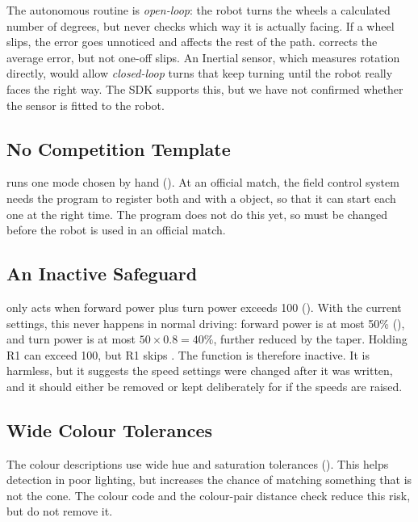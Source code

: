 The autonomous routine is \emph{open-loop}: the robot turns the wheels a calculated
number of degrees, but never checks which way it is actually facing. If a wheel
slips, the error goes unnoticed and affects the rest of the path. 
corrects the average error, but not one-off slips. An Inertial sensor, which
measures rotation directly, would allow \emph{closed-loop} turns that keep turning
until the robot really faces the right way. The SDK supports this, but we have not
confirmed whether the sensor is fitted to the robot.

\subsection{No Competition Template}

 runs one mode chosen by hand (). At an official match,
the field control system needs the program to register both
 and  with a  object, so that
it can start each one at the right time. The program does not do this yet, so
 must be changed before the robot is used in an official match.

\subsection{An Inactive Safeguard}

 only acts when forward power plus turn power exceeds 100
(). With the current settings, this never happens in normal
driving: forward power is at most 50\% (), and turn power is at
most $50 \times 0.8 = 40\%$, further reduced by the taper. Holding R1 can exceed
100, but R1 skips . The function is therefore inactive. It is
harmless, but it suggests the speed settings were changed after it was written,
and it should either be removed or kept deliberately for if the speeds are raised.

\subsection{Wide Colour Tolerances}

The colour descriptions use wide hue and saturation tolerances
(). This helps detection in poor lighting, but increases the
chance of matching something that is not the cone. The colour code and the
colour-pair distance check reduce this risk, but do not remove it.

